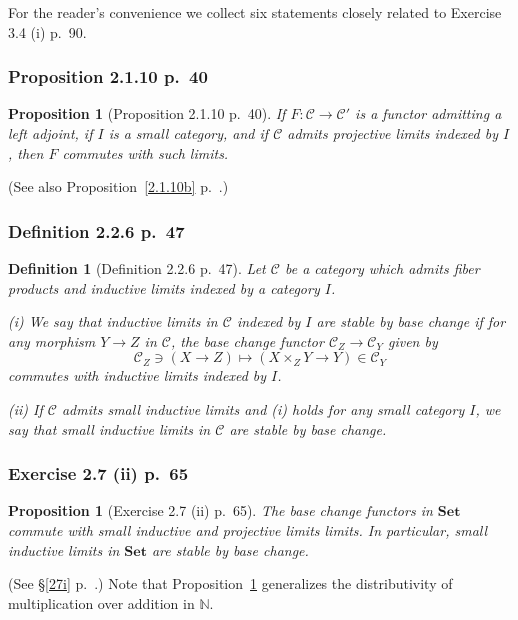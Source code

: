 \documentclass[12pt]{article}%
\newtheorem{prop}[thm]{Proposition}
\newtheorem{df}[thm]{Definition}%
\theoremstyle{remark}
\theoremstyle{definition}
\newcommand{\nn}{\noindent}
\newcommand{\bb}{\mathbb}
\newcommand{\C}{\mathcal C}
\newcommand{\Set}{\mathbf{Set}}%
\begin{document}
For the reader's convenience we collect six statements closely related to Exercise 3.4 (i) p.~90. 

\subsubsection{Proposition 2.1.10 p.~40}

\begin{prop}[Proposition 2.1.10 p.~40]\label{2.1.10}
If $F:\C\to\C'$ is a functor admitting a left adjoint, if $I$ is a small category, and if $\C$ admits projective limits indexed by $I$, then $F$ commutes with such limits.
\end{prop}

(See also Proposition~\ref{2.1.10b} p.~\pageref{2.1.10b}.)

\subsubsection{Definition 2.2.6 p.~47}

\begin{df}[Definition 2.2.6 p.~47]\label{dsbc}
Let $\C$ be a category which admits fiber products and inductive limits indexed by a category $I$.

\nn\emph{(i)} We say that inductive limits in $\C$ indexed by $I$ are \emph{stable by base change} if for any morphism $Y\to Z$ in $\C$, the base change functor 
$\C_Z\to\C_Y$ given by 
$$
\C_Z\ni(X\to Z)\mapsto(X\times_ZY\to Y)\in\C_Y
$$ 
commutes with inductive limits indexed by $I$.

\nn\emph{(ii)} If $\C$ admits small inductive limits and \emph{(i)} holds for any small category $I$, we say that \emph{small inductive limits in $\C$ are stable by base change}.
\end{df}

\subsubsection{Exercise 2.7 (ii) p.~65}

\begin{prop}[Exercise 2.7 (ii) p.~65]\label{sbcs}
The base change functors in $\Set$ commute with small inductive and projective limits limits. In particular, small inductive limits in $\Set$ are stable by base change.
\end{prop}

(See \S\ref{27i} p.~\pageref{27i}.) Note that Proposition~\ref{sbcs} generalizes the distributivity of multiplication over addition in $\bb N$.
\end{document}
